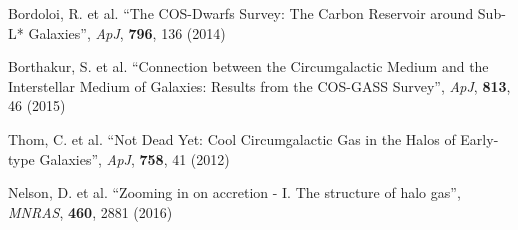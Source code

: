 \documentclass[11pt,letterpaper,english]{article}
\begin{document}
{\begin{thebibliography}{500}
 Bordoloi, R. et al. ``The COS-Dwarfs Survey: The Carbon Reservoir around Sub-L* Galaxies'', {\em ApJ}, {\bf 796}, 136 (2014)

 Borthakur, S. et al. ``Connection between the Circumgalactic Medium and the Interstellar Medium of Galaxies: Results from the COS-GASS Survey'', {\em ApJ}, {\bf 813}, 46 (2015)

 Thom, C. et al. ``Not Dead Yet: Cool Circumgalactic Gas in the Halos of Early-type Galaxies'', {\em ApJ}, {\bf 758}, 41 (2012)

 Nelson, D. et al. ``Zooming in on accretion - I. The structure of halo gas'', {\em MNRAS}, {\bf 460}, 2881 (2016)
\vspace{-.09in}
\end{thebibliography}
}
\end{document}
